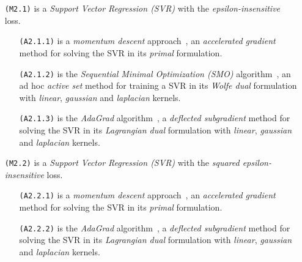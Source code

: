 \bigskip

\begin{itemize}
\item[\texttt{(M2.1)}] is a \emph{Support Vector Regression (SVR)} with the \emph{epsilon-insensitive} loss.

\begin{itemize}
\item[\texttt{(A2.1.1)}] is a \emph{momentum descent} approach~\cite{polyak1964some, nesterov1998introductory, nesterov1983method}, an \emph{accelerated gradient} method for solving the SVR in its \emph{primal} formulation.

\item[\texttt{(A2.1.2)}] is the \emph{Sequential Minimal Optimization (SMO)} algorithm~\cite{flake2002efficient, shevade1999improvements}, an ad hoc \emph{active set} method for training a SVR in its \emph{Wolfe dual} formulation with \emph{linear}, \emph{gaussian} and \emph{laplacian} kernels.

\item[\texttt{(A2.1.3)}] is the \emph{AdaGrad} algorithm~\cite{duchi2011adaptive}, a \emph{deflected subgradient} method for solving the SVR in its \emph{Lagrangian dual} formulation with \emph{linear}, \emph{gaussian} and \emph{laplacian} kernels.
\end{itemize}

\end{itemize}

\begin{itemize}
\item[\texttt{(M2.2)}] is a \emph{Support Vector Regression (SVR)} with the \emph{squared epsilon-insensitive} loss.

\begin{itemize}
\item[\texttt{(A2.2.1)}] is a \emph{momentum descent} approach~\cite{polyak1964some, nesterov1998introductory, nesterov1983method}, an \emph{accelerated gradient} method for solving the SVR in its \emph{primal} formulation.

\item[\texttt{(A2.2.2)}] is the \emph{AdaGrad} algorithm~\cite{duchi2011adaptive}, a \emph{deflected subgradient} method for solving the SVR in its \emph{Lagrangian dual} formulation with \emph{linear}, \emph{gaussian} and \emph{laplacian} kernels.
\end{itemize}

\end{itemize}